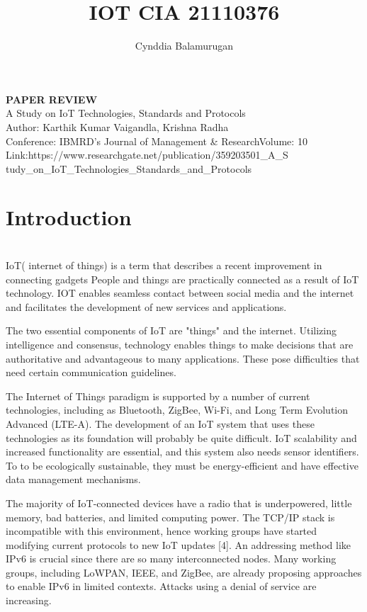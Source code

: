 \documentclass{article}
\title{IOT CIA 21110376}
\author{Cynddia Balamurugan}
\begin{document}
\maketitle
\begin{center}
    \textbf{PAPER REVIEW}
    \\{A Study on IoT Technologies, Standards and Protocols
\\ Author: Karthik Kumar Vaigandla, Krishna Radha
\\Conference: IBMRD's Journal of Management & ResearchVolume: 10
\\Link:https://www.researchgate.net/publication/359203501_A_S
tudy_on_IoT_Technologies_Standards_and_Protocols
}

\end{center}
\section{Introduction}
\\ 

IoT( internet of things) is a term that describes a recent improvement in connecting  gadgets People and things are practically connected as a result of IoT technology. IOT enables seamless contact between social media and the internet and facilitates the development of new services and applications.

 The two essential components of IoT are "things" and the internet. Utilizing intelligence and consensus, technology enables things to make decisions that are authoritative and advantageous to many applications. These pose difficulties that need certain communication guidelines.

The Internet of Things paradigm is supported by a number of current technologies, including as Bluetooth, ZigBee, Wi-Fi, and Long Term Evolution Advanced (LTE-A). The development of an IoT system that uses these technologies as its foundation will probably be quite difficult. IoT scalability and increased functionality are essential, and this system also needs sensor identifiers. To to be ecologically sustainable, they must be energy-efficient and have effective data management mechanisms.

The majority of IoT-connected devices have a radio that is underpowered, little memory, bad batteries, and limited computing power. The TCP/IP stack is incompatible with this environment, hence working groups have started modifying current protocols to new IoT updates [4]. An addressing method like IPv6 is crucial since there are so many interconnected nodes. Many working groups, including LoWPAN, IEEE, and ZigBee, are already proposing approaches to enable IPv6 in limited contexts. Attacks using a denial of service are increasing.
\end{document}
